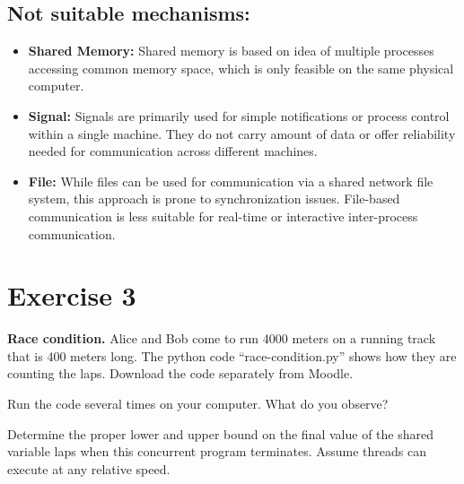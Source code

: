 \documentclass{article}
\newcommand{\exercise}[1]{
    \section*{Exercise #1}
    \markboth{Exercise #1}{}
}
\begin{document}
\subsection*{Not suitable mechanisms:}

\begin{itemize}
    \item \textbf{Shared Memory:} Shared memory is based on idea
    of multiple processes accessing common memory space, which is
    only feasible on the same physical computer.
    \item \textbf{Signal:} Signals are primarily used for simple
    notifications or process control within a single machine.
    They do not carry amount of data or offer reliability needed
    for communication across different machines.
    \item \textbf{File:} While files can be used for communication
    via a shared network file system, this approach is prone
    to synchronization issues. File-based communication is less
    suitable for real-time or interactive inter-process communication.
\end{itemize}




\newpage

\exercise{3}
\textbf{Race condition.} Alice and Bob come to run 4000 meters on a running track that is 400 meters
long. The python code “race-condition.py” shows how they are counting the laps. Download the
code separately from Moodle.

\begin{enumerate}[label=\textbf{\makebox[1cm][l]{\Huge\text{(\stylishfont\alph*)}}}, leftmargin=!, labelindent=0pt]
  \item Run the code several times on your computer.
  What do you observe?\newline
  
  \item Determine the proper lower and upper bound on the final value
  of the shared variable laps when this concurrent program terminates.
  Assume threads can execute at any relative speed.
\end{enumerate}

\newpage
\printbibliography
\end{document}
